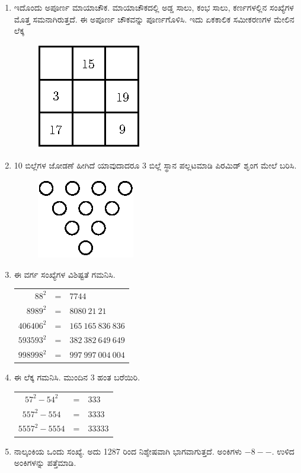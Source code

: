 \begin{enumerate}
\item ಇದೊಂದು ಅಪೂರ್ಣ ಮಾಯಾಚೌಕ. ಮಾಯಾಚೌಕದಲ್ಲಿ ಅಡ್ಡ ಸಾಲು, ಕಂಭ ಸಾಲು, ಕರ್ಣಗಳಲ್ಲಿನ ಸಂಖ್ಯೆಗಳ ಮೊತ್ತ ಸಮನಾಗಿರುತ್ತದೆ. ಈ ಅಪೂರ್ಣ ಚೌಕವನ್ನು ಪೂರ್ಣಗೊಳಿಸಿ. ಇದು ಏಕಕಾಲಿಕ ಸಮೀಕರಣಗಳ ಮೇಲಿನ ಲೆಕ್ಕ 
\begin{figure}[H]
\centering
\includegraphics{images/chap10/q26.eps}
\end{figure}
 
\item 10 ಬಿಲ್ಲೆಗಳ ಜೋಡಣೆ ಹೀಗಿದೆ ಯಾವುದಾದರೂ 3 ಬಿಲ್ಲೆ ಸ್ಥಾನ ಪಲ್ಲಟಮಾಡಿ ಪಿರಮಿಡ್ ಶೃಂಗ ಮೇಲೆ ಬರಿಸಿ. 
\begin{figure}[H]
\centering
\includegraphics{images/chap10/q27.eps}
\end{figure}

\item ಈ ವರ್ಗ ಸಂಖ್ಯೆಗಳ ವಿಶಿಷ್ಟತೆ ಗಮನಿಸಿ. 

\begin{tabular}[t]{rcl}
$88^{2}$ & = & $7744$\\
$8989^{2}$ & = & $8080~21~21$\\
$406406^{2}$ & = & $165~165~836~836$\\
$593593^{2}$ & = & $382~382~649~649$\\
$998998^{2}$ & = & $997~997~004~004$
\end{tabular}

\item ಈ ಲೆಕ್ಕ ಗಮನಿಸಿ. ಮುಂದಿನ 3 ಹಂತ ಬರೆಯಿರಿ. 

\begin{tabular}[t]{ccl}
$57^{2} - 54^{2}$ & = & $333$\\
$557^{2} - 554$ & = & $3333$\\
$5557^{2} - 5554$ & = & $33333$
\end{tabular}

\item ನಾಲ್ಕಂಕಿಯ ಒಂದು ಸಂಖ್ಯೆ. ಅದು 1287 ರಿಂದ ನಿಶ್ಶೇಷವಾಗಿ ಭಾಗವಾಗುತ್ತದೆ. ಅಂಕಿಗಳು $- 8 - -$. ಉಳಿದ ಅಂಕಿಗಳನ್ನು ಪತ್ತೆಮಾಡಿ.  
\end{enumerate}

